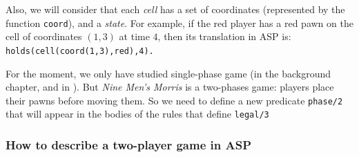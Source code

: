 \bigskip

Also, we will consider that each \textit{cell} has a set of coordinates (represented by the function \texttt{coord}), and a \textit{state}. For example, if the red player has a red pawn on the cell of coordinates $(1,3)$ at time $4$, then its translation in ASP is: \texttt{holds(cell(coord(1,3),red),4).}

\bigskip

For the moment, we only have studied single-phase game (in the background chapter, and in \cite{thielscher2009answer}). But \textit{Nine Men's Morris} is a two-phases game: players place their pawns before moving them. So we need to define a new predicate \texttt{phase/2} that will appear in the bodies of the rules that define \texttt{legal/3}

\subsubsection{How to describe a two-player game in ASP}

